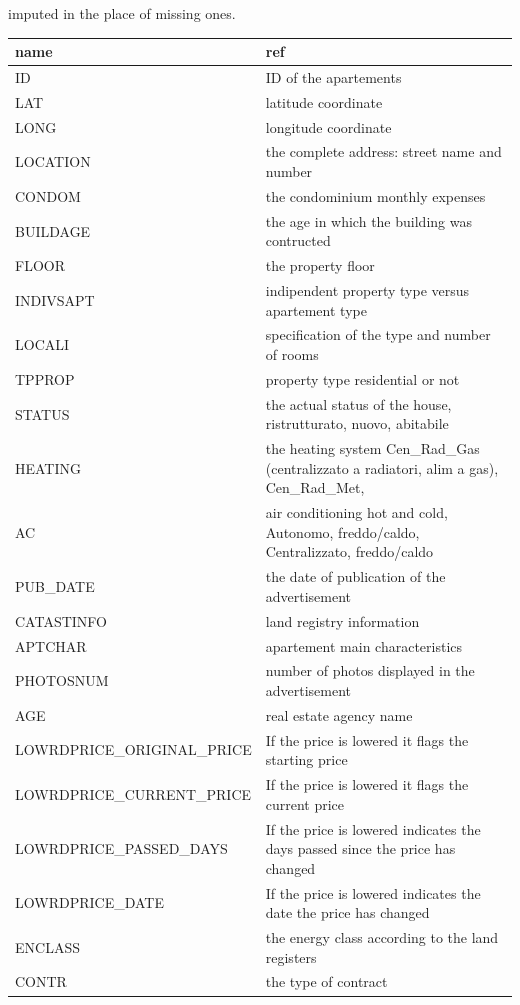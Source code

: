 \documentclass[
  12pt,
  a4paper,
  oneside]{book}
\theoremstyle{definition}
\theoremstyle{definition}
\theoremstyle{definition}
\theoremstyle{remark}
\begin{document}
imputed in the place of missing ones.

\begin{longtable}{ll}
\toprule
name & ref\\
\midrule
ID & ID of the apartements\\
LAT & latitude coordinate\\
LONG & longitude coordinate\\
LOCATION & the complete address: street name and number\\
CONDOM & the condominium monthly expenses\\
\addlinespace
BUILDAGE & the age in which the building was contructed\\
FLOOR & the property floor\\
INDIVSAPT & indipendent property type versus apartement type\\
LOCALI & specification of the type and number of rooms\\
TPPROP & property type residential or not\\
\addlinespace
STATUS & the actual status of the house, ristrutturato, nuovo, abitabile\\
HEATING & the heating system Cen\_Rad\_Gas (centralizzato a radiatori, alim a gas), Cen\_Rad\_Met,\\
AC & air conditioning hot and cold, Autonomo, freddo/caldo, Centralizzato, freddo/caldo\\
PUB\_DATE & the date of publication of the advertisement\\
CATASTINFO & land registry information\\
\addlinespace
APTCHAR & apartement main characteristics\\
PHOTOSNUM & number of photos displayed in the advertisement\\
AGE & real estate agency name\\
LOWRDPRICE\_ORIGINAL\_PRICE & If the price is lowered it flags the starting price\\
LOWRDPRICE\_CURRENT\_PRICE & If the price is lowered it flags the current price\\
\addlinespace
LOWRDPRICE\_PASSED\_DAYS & If the price is lowered indicates the days passed since the price has changed\\
LOWRDPRICE\_DATE & If the price is lowered indicates the date the price has changed\\
ENCLASS & the energy class according to the land registers\\
CONTR & the type of contract\\

\end{longtable}
\end{document}
